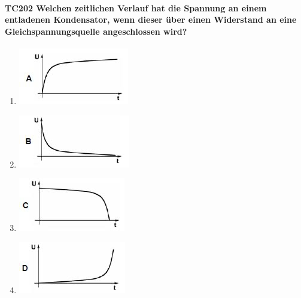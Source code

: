 \documentclass[8pt]{article}
\begin{document}
\begin{enumerate}
\begin{enumerate}[nolistsep,label=\Alph*]
{\paragraph*{TC202 Welchen zeitlichen Verlauf hat die Spannung an einem entladenen Kondensator, wenn dieser über einen Widerstand an eine Gleichspannungsquelle angeschlossen wird?}
\begin{enumerate}[nolistsep,label=\Alph*]
\item
	\begin{center}
		\begin{minipage}{\linewidth}
			\centering
			\includegraphics[scale=1.0]{pics/tc202_a.jpg}
		\end{minipage}
	\end{center}
\item
	\begin{center}
		\begin{minipage}{\linewidth}
			\centering
			\includegraphics[scale=1.0]{pics/tc202_b.jpg}
		\end{minipage}
	\end{center}
\item
	\begin{center}
		\begin{minipage}{\linewidth}
			\centering
			\includegraphics[scale=1.0]{pics/tc202_c.jpg}
		\end{minipage}
	\end{center}
\item
	\begin{center}
		\begin{minipage}{\linewidth}
			\centering
			\includegraphics[scale=1.0]{pics/tc202_d.jpg}
		\end{minipage}
	\end{center}
\end{enumerate}

}
\end{enumerate}
\end{enumerate}
\end{document}
